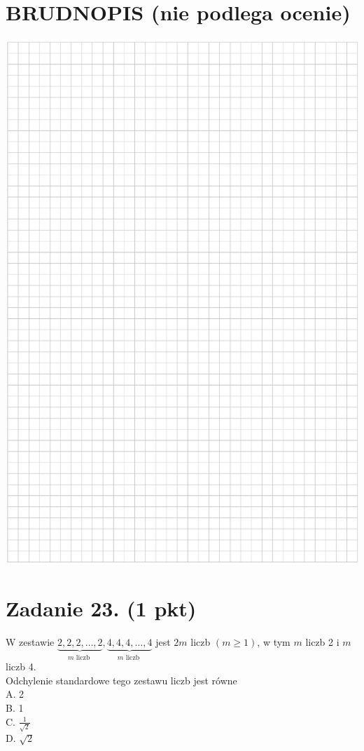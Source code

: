 \documentclass[10pt]{article}
\begin{document}
\section*{BRUDNOPIS (nie podlega ocenie)}
\begin{center}
\includegraphics[max width=\textwidth]{2024_11_21_9383c97fb44abf35abe9g-11}
\end{center}

\section*{Zadanie 23. (1 pkt)}
W zestawie \(\underbrace{2,2,2, \ldots, 2}_{m \text { liczb }}, \underbrace{4,4,4, \ldots, 4}_{m \text { liczb }}\) jest \(2 m\) liczb \((m \geq 1)\), w tym \(m\) liczb 2 i \(m\) liczb 4.\\
Odchylenie standardowe tego zestawu liczb jest równe\\
A. 2\\
B. 1\\
C. \(\frac{1}{\sqrt{2}}\)\\
D. \(\sqrt{2}\)
\end{document}
